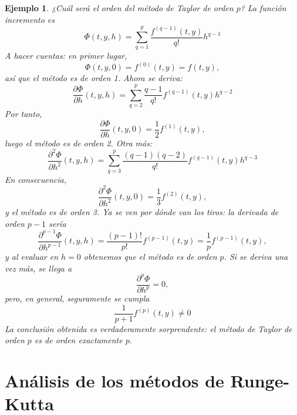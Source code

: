 \documentclass[11pt]{report}
\theoremstyle{mytheorem}
\theoremstyle{mydefinition}
\theoremstyle{myexample}
\newtheorem*{example}{Ejemplo}
\begin{document}
\begin{example}
¿Cuál será el orden del método de Taylor de orden $p$? La función incremento es
\[\Phi(t,y,h) = \sum_{q=1}^p \frac{f^{(q-1)}(t,y)}{q!}h^{q-1}\]
A hacer cuentas: en primer lugar,
\[\Phi(t,y,0) = f^{(0)}(t,y) = f(t,y),\]
así que el método es de orden 1. Ahora se deriva:
\[\frac{\partial \Phi}{\partial h}(t,y,h) = \sum_{q=2}^{p}\frac{q-1}{q!}f^{(q-1)}(t,y)h^{q-2}\]
Por tanto,
\[\frac{\partial \Phi}{\partial h}(t,y,0) =\frac{1}{2}f^{(1)}(t,y),\]
luego el método es de orden 2. Otra más:
\[\frac{\partial^2\Phi}{\partial h^2}(t,y,h) = \sum_{q=3}^{p}\frac{(q-1)(q-2)}{q!}f^{(q-1)}(t,y)h^{q-3}\]
En consecuencia,
\[\frac{\partial^2\Phi}{\partial h^2}(t,y,0) = \frac{1}{3}f^{(2)}(t,y),\]
y el método es de orden 3. Ya se ven por dónde van los tiros: la derivada de orden $p-1$ sería
\[\frac{\partial^{p-1} \Phi}{\partial h^{p-1}}(t,y,h) = \frac{(p-1)!}{p!}f^{(p-1)}(t,y) = \frac{1}{p}f^{(p-1)}(t,y),\]
y al evaluar en $h = 0$ obtenemos que el método es de orden $p$. Si se deriva una vez más, se llega a
\[\frac{\partial^p \Phi}{\partial h^p} = 0,\]
pero, en general, seguramente se cumpla
\[\frac{1}{p+1}f^{(p)}(t,y) \neq 0\]
La conclusión obtenida es verdaderamente sorprendente: el método de Taylor de orden $p$ es de orden exactamente $p$.
\end{example}

\section{Análisis de los métodos de Runge-Kutta}
\end{document}
